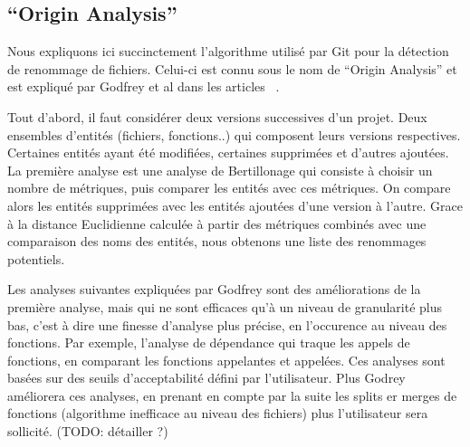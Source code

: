 \subsection{``Origin Analysis''}

Nous expliquons ici succinctement l'algorithme utilisé par Git pour la détection de renommage de fichiers. Celui-ci est connu sous le nom de ``Origin Analysis'' et est expliqué par Godfrey et al dans les articles ~\cite{tu_integrated_2002,godfrey_tracking_2002,godfrey_using_2005}.

Tout d'abord, il faut considérer deux versions successives d'un projet. Deux ensembles d'entités (fichiers, fonctions..) qui composent leurs versions respectives. Certaines entités ayant été modifiées, certaines supprimées et d'autres ajoutées.
La première analyse est une analyse de Bertillonage qui consiste à choisir un nombre de métriques, puis comparer les entités avec ces métriques. On compare alors les entités supprimées avec les entités ajoutées d'une version à l'autre. Grace à la distance Euclidienne calculée à partir des métriques combinés avec une comparaison des noms des entités, nous obtenons une liste des renommages potentiels.

Les analyses suivantes expliquées par Godfrey sont des améliorations de la première analyse, mais qui ne sont efficaces qu'à un niveau de granularité plus bas, c'est à dire une finesse d'analyse plus précise, en l'occurence au niveau des fonctions. Par exemple, l'analyse de dépendance qui traque les appels de fonctions, en comparant les fonctions appelantes et appelées. Ces analyses sont basées sur des seuils d'acceptabilité défini par l'utilisateur. Plus Godrey améliorera ces analyses, en prenant en compte par la suite les splits er merges de fonctions (algorithme inefficace au niveau des fichiers) plus l'utilisateur sera sollicité. (TODO: détailler ?)\\
